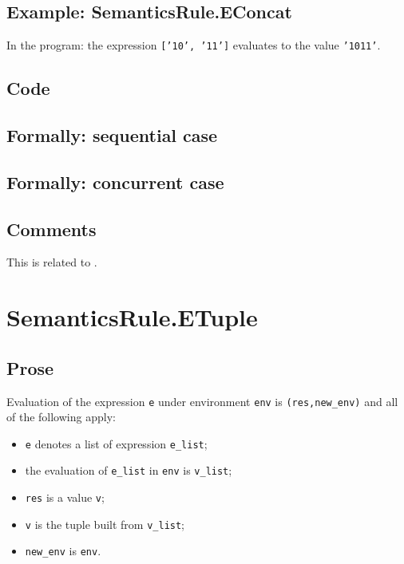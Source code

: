 \documentclass{book}
\begin{document}
  \subsection{Example: SemanticsRule.EConcat}
    In the program:
    the expression \texttt{['10', '11']} evaluates to the value \texttt{'1011'}.

  \subsection{Code}

\begin{emptyformal}
  \subsection{Formally: sequential case}

  \subsection{Formally: concurrent case}
\end{emptyformal}

\subsection{Comments}
  This is related to .

\section{SemanticsRule.ETuple \label{sec:SemanticsRule.ETuple}}

  \subsection{Prose}
  Evaluation of the expression \texttt{e} under environment \texttt{env} is
  \texttt{(res,new\_env)} and all of the following apply:
  \begin{itemize}
  \item \texttt{e} denotes a list of expression \texttt{e\_list};
  \item the evaluation of \texttt{e\_list} in \texttt{env} is \texttt{v\_list};
  \item \texttt{res} is a value \texttt{v};
  \item \texttt{v} is the tuple built from \texttt{v\_list};
  \item \texttt{new\_env} is \texttt{env}.
  \end{itemize}
\end{document}
